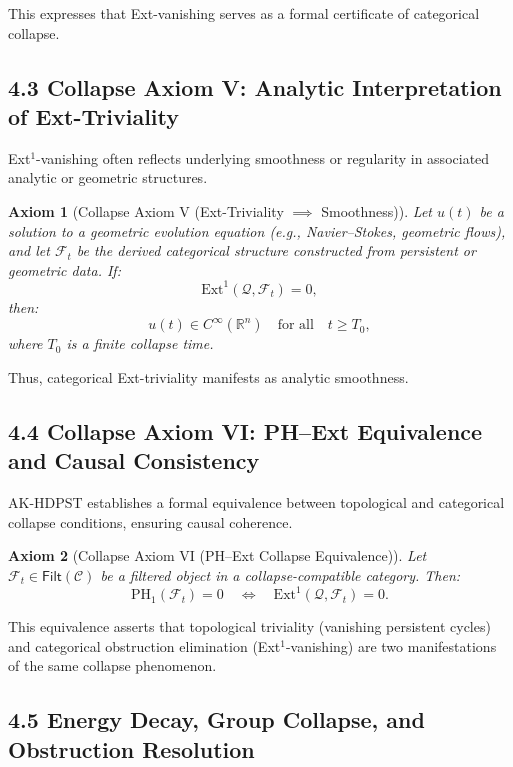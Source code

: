 \documentclass[11pt]{article}
\newtheorem{axiom}{Axiom}[section]
\begin{document}
This expresses that Ext-vanishing serves as a formal certificate of categorical collapse.

\subsection*{4.3 Collapse Axiom V: Analytic Interpretation of Ext-Triviality}

Ext$^1$-vanishing often reflects underlying smoothness or regularity in associated analytic or geometric structures.

\begin{axiom}[Collapse Axiom V (Ext-Triviality $\implies$ Smoothness)]
Let \( u(t) \) be a solution to a geometric evolution equation (e.g., Navier–Stokes, geometric flows),  
and let \( \mathcal{F}_t \) be the derived categorical structure constructed from persistent or geometric data.  
If:
\[
\mathrm{Ext}^1(\mathcal{Q}, \mathcal{F}_t) = 0,
\]
then:
\[
u(t) \in C^\infty(\mathbb{R}^n) \quad \text{for all} \quad t \geq T_0,
\]
where \( T_0 \) is a finite collapse time.
\end{axiom}

Thus, categorical Ext-triviality manifests as analytic smoothness.

\subsection*{4.4 Collapse Axiom VI: PH–Ext Equivalence and Causal Consistency}

AK-HDPST establishes a formal equivalence between topological and categorical collapse conditions, ensuring causal coherence.

\begin{axiom}[Collapse Axiom VI (PH–Ext Collapse Equivalence)]
Let \( \mathcal{F}_t \in \mathsf{Filt}(\mathcal{C}) \) be a filtered object in a collapse-compatible category. Then:
\[
\mathrm{PH}_1(\mathcal{F}_t) = 0 \quad \Longleftrightarrow \quad \mathrm{Ext}^1(\mathcal{Q}, \mathcal{F}_t) = 0.
\]
\end{axiom}

This equivalence asserts that topological triviality (vanishing persistent cycles) and categorical obstruction elimination (Ext$^1$-vanishing) are two manifestations of the same collapse phenomenon.

\subsection*{4.5 Energy Decay, Group Collapse, and Obstruction Resolution}
\end{document}
